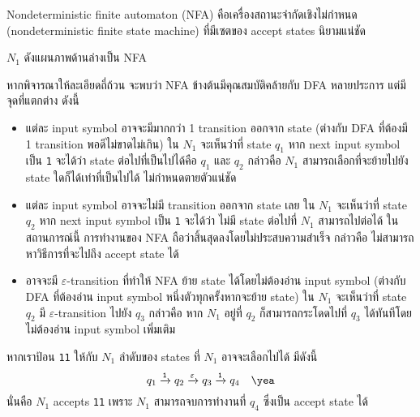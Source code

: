 Nondeterministic finite automaton (NFA) คือเครื่องสถานะจำกัดเชิงไม่กำหนด (nondeterministic finite state machine) ที่มีเซตของ accept states นิยามแน่ชัด
%
\begin{example}
$N_1$ ดังแผนภาพด้านล่างเป็น NFA
\begin{center}
\end{center}
หากพิจารณาให้ละเอียดถี่ถ้วน จะพบว่า NFA ข้างต้นมีคุณสมบัติคล้ายกับ DFA หลายประการ แต่มีจุดที่แตกต่าง ดังนี้
\begin{itemize}
\item แต่ละ input symbol อาจจะมีมากกว่า 1 transition ออกจาก state (ต่างกับ DFA ที่ต้องมี 1 transition พอดีไม่ขาดไม่เกิน) \enskip ใน $N_1$ จะเห็นว่าที่ state $q_1$ หาก next input symbol เป็น \texttt{1} จะได้ว่า state ต่อไปที่เป็นไปได้คือ $q_1$ และ $q_2$ กล่าวคือ $N_1$ สามารถเลือกที่จะย้ายไปยัง state ใดก็ได้เท่าที่เป็นไปได้ ไม่กำหนดตายตัวแน่ชัด
\item แต่ละ input symbol อาจจะไม่มี transition ออกจาก state เลย \enskip ใน $N_1$ จะเห็นว่าที่ state $q_2$ หาก next input symbol เป็น \texttt{1} จะได้ว่า ไม่มี state ต่อไปที่ $N_1$ สามารถไปต่อได้ \enskip ในสถานการณ์นี้ การทำงานของ NFA ถือว่าสิ้นสุดลงโดยไม่ประสบความสำเร็จ กล่าวคือ ไม่สามารถหาวิธีการที่จะไปถึง accept state ได้
\item อาจจะมี $\varepsilon$-transition ที่ทำให้ NFA ย้าย state ได้โดยไม่ต้องอ่าน input symbol (ต่างกับ DFA ที่ต้องอ่าน input symbol หนึ่งตัวทุกครั้งหากจะย้าย state) \enskip ใน $N_1$ จะเห็นว่าที่ state $q_2$ มี $\varepsilon$-transition ไปยัง $q_3$ กล่าวคือ หาก $N_1$ อยู่ที่ $q_2$ ก็สามารถกระโดดไปที่ $q_3$ ได้ทันทีโดยไม่ต้องอ่าน input symbol เพิ่มเติม
\end{itemize}

หากเราป้อน \texttt{11} ให้กับ $N_1$ ลำดับของ states ที่ $N_1$ อาจจะเลือกไปได้ มีดังนี้ \[q_1\xrightarrow{\texttt{1}} q_2\xrightarrow{\varepsilon} q_3\xrightarrow{\texttt{1}} q_4\quad\textup{\yea}\] นั่นคือ $N_1$ accepts \texttt{11} เพราะ $N_1$ สามารถจบการทำงานที่ $q_4$ ซึ่งเป็น accept state ได้


\end{example}
